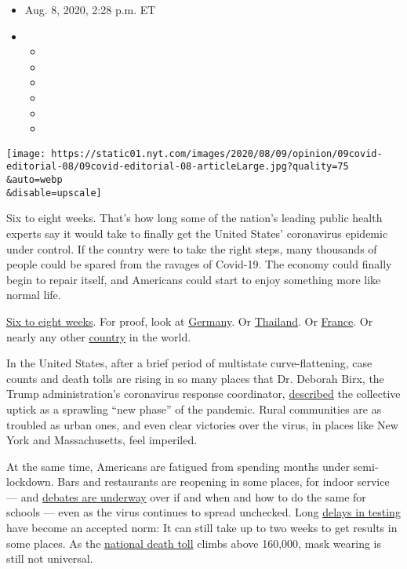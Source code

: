 \begin{itemize}
\item
  Aug. 8, 2020, 2:28 p.m. ET
\item
  \begin{itemize}
  \item
  \item
  \item
  \item
  \item
  \item
  \end{itemize}
\end{itemize}

\texttt{[image: https://static01.nyt.com/images/2020/08/09/opinion/09covid-editorial-08/09covid-editorial-08-articleLarge.jpg?quality=75\\\&auto=webp\\\&disable=upscale]}

Six to eight weeks. That's how long some of the nation's leading public
health experts say it would take to finally get the United States'
coronavirus epidemic under control. If the country were to take the
right steps, many thousands of people could be spared from the ravages
of Covid-19. The economy could finally begin to repair itself, and
Americans could start to enjoy something more like normal life.

\href{https://www.nejm.org/doi/full/10.1056/NEJMms2024920}{Six to eight
weeks}. For proof, look at
\href{https://www.nytimes.com/2020/08/05/world/europe/germany-coronavirus-test-travelers.html}{Germany}.
Or
\href{https://www.nytimes.com/2020/07/16/world/asia/coronavirus-thailand-photos.html}{Thailand}.
Or
\href{https://www.nytimes.com/2020/06/05/world/europe/coronavirus-france-macron-reopening.html}{France}.
Or nearly any other
\href{https://www.nytimes.com/2020/08/06/us/coronavirus-us.html}{country}
in the world.

In the United States, after a brief period of multistate
curve-flattening, case counts and death tolls are rising in so many
places that Dr. Deborah Birx, the Trump administration's coronavirus
response coordinator,
\href{https://www.nytimes.com/2020/08/02/health/dr-birx-coronavirus-phase.html}{described}
the collective uptick as a sprawling ``new phase'' of the pandemic.
Rural communities are as troubled as urban ones, and even clear
victories over the virus, in places like New York and Massachusetts,
feel imperiled.

At the same time, Americans are fatigued from spending months under
semi-lockdown. Bars and restaurants are reopening in some places, for
indoor service --- and
\href{https://www.nytimes.com/2020/07/23/sunday-review/reopening-schools-coronavirus.html}{debates
are underway} over if and when and how to do the same for schools ---
even as the virus continues to spread unchecked. Long
\href{https://www.nytimes.com/2020/07/23/nyregion/coronavirus-testing-nyc.html}{delays
in testing} have become an accepted norm: It can still take up to two
weeks to get results in some places. As the
\href{https://www.nytimes.com/interactive/2020/us/coronavirus-us-cases.html}{national
death toll} climbs above 160,000, mask wearing is still not universal.

